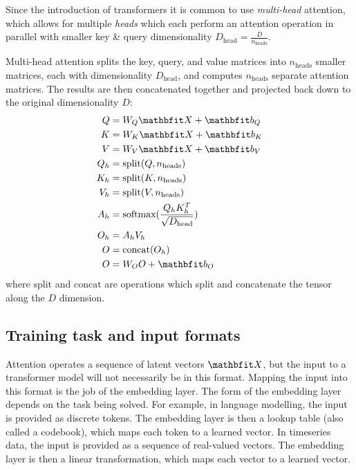 Since the introduction of transformers it is common to use \textit{multi-head} attention, which allows for multiple \textit{heads} which each perform an attention operation in parallel with smaller key \& query dimensionality $D_{\text{head}} = \frac{D}{ n_{\text{heads}}}$.

Multi-head attention splits the key, query, and value matrices into $n_{\text{heads}}$ smaller matrices, each with dimensionality $D_{\text{head}}$, and computes $n_{\text{heads}}$ separate attention matrices. The results are then concatenated together and projected back down to the original dimensionality $D$:
\begin{align}
\begin{aligned}
\label{eqn:multi-head-attn}
Q &= W_{Q} \X + \vb_{Q} \\
K &= W_{K} \X + \vb_{K} \\
V &= W_{V} \X + \vb_{V} \\
Q_{h} &= \text{split}(Q, n_{\text{heads}}) \\
K_{h} &= \text{split}(K, n_{\text{heads}}) \\
V_{h} &= \text{split}(V, n_{\text{heads}}) \\
A_{h} &= \text{softmax}(\frac{Q_{h}K_{h}^T}{\sqrt{D_{\text{head}}}}) \\
O_{h} &= A_{h}V_{h} \\
O &= \text{concat}(O_{h}) \\
O &= W_{O}O + \vb_{O}
\end{aligned}
\end{align}
where $\text{split}$ and $\text{concat}$ are operations which split and concatenate the tensor along the $D$ dimension.

\subsection{Training task and input formats}
\label{ss:transformer-inputs}

Attention operates a sequence of latent vectors $\X$, but the input to a transformer model will not necessarily be in this format. Mapping the input into this format is the job of the embedding layer. The form of the embedding layer depends on the task being solved. For example, in language modelling, the input is provided as discrete tokens. The embedding layer is then a lookup table (also called a codebook), which maps each token to a learned vector. In timeseries data, the input is provided as a sequence of real-valued vectors. The embedding layer is then a linear transformation, which maps each vector to a learned vector.

